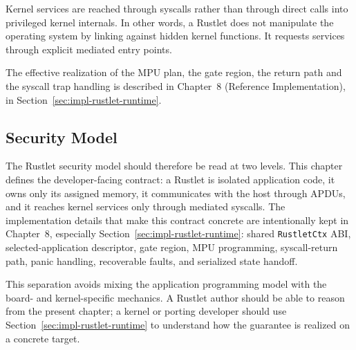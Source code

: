 Kernel services are reached through syscalls rather than through direct
calls into privileged kernel internals. In other words, a Rustlet does
not manipulate the operating system by linking against hidden kernel
functions. It requests services through explicit mediated entry points.

The effective realization of the MPU plan, the gate region, the return
path and the syscall trap handling is described in Chapter~8 (Reference
Implementation), in Section~\ref{sec:impl-rustlet-runtime}.

\subsection{Security Model}

The Rustlet security model should therefore be read at two levels. This
chapter defines the developer-facing contract: a Rustlet is isolated
application code, it owns only its assigned memory, it communicates with
the host through APDUs, and it reaches kernel services only through
mediated syscalls. The implementation details that make this contract
concrete are intentionally kept in Chapter~8, especially
Section~\ref{sec:impl-rustlet-runtime}: shared \texttt{RustletCtx} ABI,
selected-application descriptor, gate region, MPU programming,
syscall-return path, panic handling, recoverable faults, and serialized
state handoff.

This separation avoids mixing the application programming model with the
board- and kernel-specific mechanics. A Rustlet author should be able to
reason from the present chapter; a kernel or porting developer should use
Section~\ref{sec:impl-rustlet-runtime} to understand how the guarantee is
realized on a concrete target.

